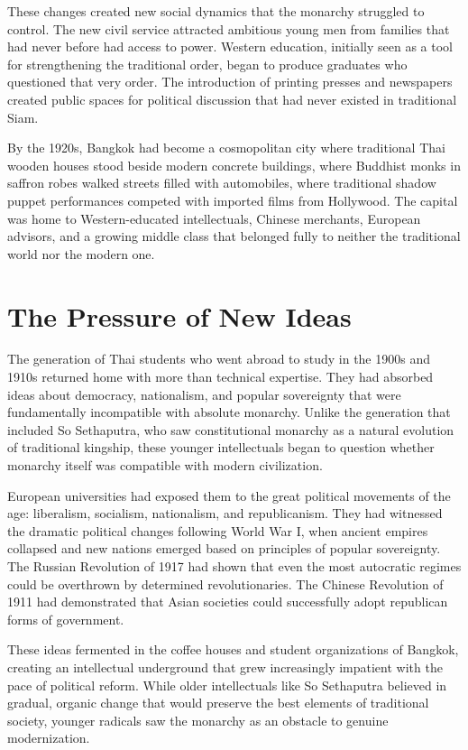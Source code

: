 \documentclass[
  Letterpaper,
]{scrbook}
\begin{document}
These changes created new social dynamics that the monarchy struggled to
control. The new civil service attracted ambitious young men from
families that had never before had access to power. Western education,
initially seen as a tool for strengthening the traditional order, began
to produce graduates who questioned that very order. The introduction of
printing presses and newspapers created public spaces for political
discussion that had never existed in traditional Siam.

By the 1920s, Bangkok had become a cosmopolitan city where traditional
Thai wooden houses stood beside modern concrete buildings, where
Buddhist monks in saffron robes walked streets filled with automobiles,
where traditional shadow puppet performances competed with imported
films from Hollywood. The capital was home to Western-educated
intellectuals, Chinese merchants, European advisors, and a growing
middle class that belonged fully to neither the traditional world nor
the modern one.

\section{The Pressure of New Ideas}\label{the-pressure-of-new-ideas}

The generation of Thai students who went abroad to study in the 1900s
and 1910s returned home with more than technical expertise. They had
absorbed ideas about democracy, nationalism, and popular sovereignty
that were fundamentally incompatible with absolute monarchy. Unlike the
generation that included So Sethaputra, who saw constitutional monarchy
as a natural evolution of traditional kingship, these younger
intellectuals began to question whether monarchy itself was compatible
with modern civilization.

European universities had exposed them to the great political movements
of the age: liberalism, socialism, nationalism, and republicanism. They
had witnessed the dramatic political changes following World War I, when
ancient empires collapsed and new nations emerged based on principles of
popular sovereignty. The Russian Revolution of 1917 had shown that even
the most autocratic regimes could be overthrown by determined
revolutionaries. The Chinese Revolution of 1911 had demonstrated that
Asian societies could successfully adopt republican forms of government.

These ideas fermented in the coffee houses and student organizations of
Bangkok, creating an intellectual underground that grew increasingly
impatient with the pace of political reform. While older intellectuals
like So Sethaputra believed in gradual, organic change that would
preserve the best elements of traditional society, younger radicals saw
the monarchy as an obstacle to genuine modernization.
\end{document}
